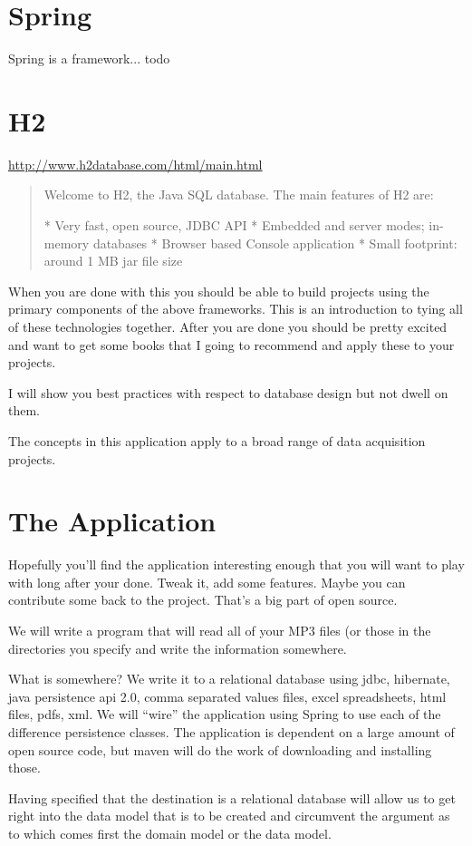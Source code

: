 \documentclass[a4paper,10pt]{book}
\begin{document}
\section{Spring}
Spring is a framework... todo

\section{H2}
\url{http://www.h2database.com/html/main.html}
\begin{quotation}
 Welcome to H2, the Java SQL database. The main features of H2 are:

    * Very fast, open source, JDBC API
    * Embedded and server modes; in-memory databases
    * Browser based Console application
    * Small footprint: around 1 MB jar file size 
\end{quotation}
When you are done with this you should be able to build projects using the primary components of the above frameworks.  This is an introduction
to tying all of these technologies together.  After you are done you should be pretty excited and want to get some books that I going
to recommend and apply these to your projects.

I will show you best practices with respect to database design but not dwell on them.

The concepts in this application apply to a broad range of data acquisition projects.
\section{The Application}
Hopefully you'll find the application interesting enough that you will want to play with long after your done.  Tweak it, add some 
features.  Maybe you can contribute some back to the project. That's a big part of open source.

We will write a program that will read all of your MP3 files (or those in the directories you specify and write the information somewhere.

What is somewhere?  We write it to a relational database using jdbc, hibernate, java persistence api 2.0, comma separated values files, excel
spreadsheets, html files, pdfs, xml.  We will ``wire'' the application using Spring to use each of the difference persistence classes. The 
application is dependent on a large amount of open source code, but maven will do the work of downloading and installing those.

Having specified that the destination is a relational database will allow us to get right into the data model
that is to be created and circumvent the argument as to which comes first the domain model or the data model.
\end{document}
